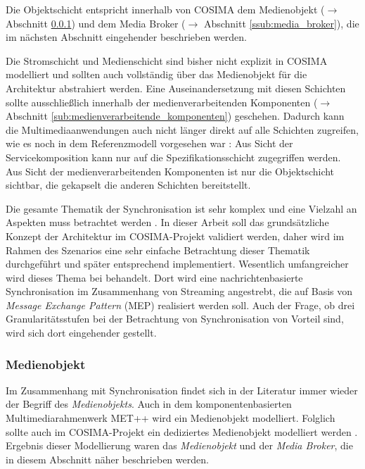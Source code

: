 
  Die Objektschicht entspricht innerhalb von COSIMA dem Medienobjekt ($\to$ Abschnitt \ref{ssub:medienobjekt}) und dem Media Broker ($\to$ Abschnitt \ref{ssub:media_broker}), die im nächsten Abschnitt eingehender beschrieben werden.
  
  Die Stromschicht und Medienschicht sind bisher nicht explizit in COSIMA modelliert und sollten auch vollständig über das Medienobjekt für die Architektur abstrahiert werden. Eine Auseinandersetzung mit diesen Schichten sollte ausschließlich innerhalb der medienverarbeitenden Komponenten ($\to$ Abschnitt \ref{sub:medienverarbeitende_komponenten}) geschehen. Dadurch kann die Multimediaanwendungen auch nicht länger direkt auf alle Schichten zugreifen, wie es noch in dem Referenzmodell vorgesehen war \citep[S. 13]{blakowski1996mss}: Aus Sicht der Servicekomposition kann nur auf die Spezifikationsschicht zugegriffen werden. Aus Sicht der medienverarbeitenden Komponenten ist nur die Objektschicht sichtbar, die gekapselt die anderen Schichten bereitstellt.

  Die gesamte Thematik der Synchronisation ist sehr komplex und eine Vielzahl an Aspekten muss betrachtet werden \citep[S. 27ff]{bericht}. In dieser Arbeit soll das grundsätzliche Konzept der Architektur im COSIMA-Projekt validiert werden, daher wird im Rahmen des Szenarios eine sehr einfache Betrachtung dieser Thematik durchgeführt und später entsprechend implementiert. Wesentlich umfangreicher wird dieses Thema bei \citep{antons09} behandelt. Dort wird eine nachrichtenbasierte Synchronisation im Zusammenhang von Streaming angestrebt, die auf Basis von \emph{Message Exchange Pattern} (MEP) realisiert werden soll. Auch der Frage, ob drei Granularitätsstufen bei der Betrachtung von Synchronisation von Vorteil sind, wird sich dort eingehender gestellt.


  
\subsubsection{Medienobjekt} %
\label{ssub:medienobjekt}

  Im Zusammenhang mit Synchronisation findet sich in der Literatur immer wieder der Begriff des \emph{Medienobjekts}. Auch in dem komponentenbasierten Multimediarahmenwerk MET++ \citep{ackermann1994dai} wird ein Medienobjekt modelliert. Folglich sollte auch im COSIMA-Projekt ein dediziertes Medienobjekt modelliert werden \citep{bericht}. Ergebnis dieser Modellierung waren das \emph{Medienobjekt} und der \emph{Media Broker}, die in diesem Abschnitt näher beschrieben werden.

